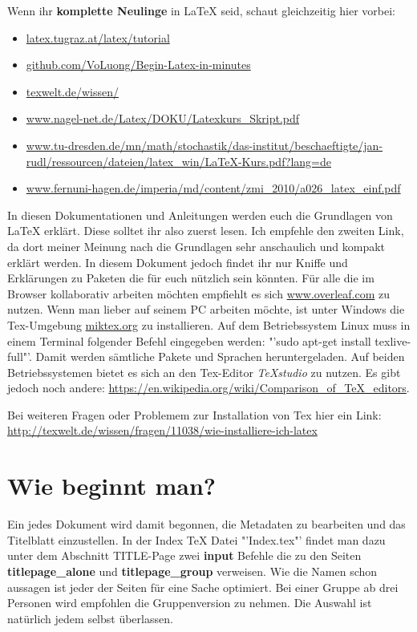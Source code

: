 Wenn ihr \textbf{komplette Neulinge} in LaTeX seid, schaut gleichzeitig hier vorbei:
\begin{itemize}
	\item \url{latex.tugraz.at/latex/tutorial}
	\item \url{github.com/VoLuong/Begin-Latex-in-minutes}
	\item \url{texwelt.de/wissen/}
	\item \url{www.nagel-net.de/Latex/DOKU/Latexkurs_Skript.pdf}
	\item \url{www.tu-dresden.de/mn/math/stochastik/das-institut/beschaeftigte/jan-rudl/ressourcen/dateien/latex_win/LaTeX-Kurs.pdf?lang=de}
	\item \url{www.fernuni-hagen.de/imperia/md/content/zmi_2010/a026_latex_einf.pdf}
\end{itemize} 
In diesen Dokumentationen und Anleitungen werden euch die Grundlagen von \LaTeX{} erklärt. Diese solltet ihr also zuerst lesen. Ich empfehle den zweiten Link, da dort meiner Meinung nach die Grundlagen sehr anschaulich und kompakt erklärt werden. In diesem Dokument jedoch findet ihr nur Kniffe und Erklärungen zu Paketen die für euch nützlich sein könnten.
Für alle die im Browser kollaborativ arbeiten möchten empfiehlt es sich \url{www.overleaf.com} zu nutzen. Wenn man lieber auf seinem PC arbeiten möchte, ist unter Windows die Tex-Umgebung \url{miktex.org} zu installieren. Auf dem Betriebssystem Linux muss in einem Terminal folgender Befehl eingegeben werden: "'sudo apt-get install texlive-full"'. Damit werden sämtliche Pakete und Sprachen heruntergeladen. Auf beiden Betriebssystemen bietet es sich an den Tex-Editor \emph{TeXstudio} zu nutzen. Es gibt jedoch noch andere: \url{https://en.wikipedia.org/wiki/Comparison_of_TeX_editors}.

Bei weiteren Fragen oder Problemem zur Installation von Tex hier ein Link:\\
\url{http://texwelt.de/wissen/fragen/11038/wie-installiere-ich-latex}

\section{Wie beginnt man?}

Ein jedes Dokument wird damit begonnen, die Metadaten zu bearbeiten und das Titelblatt einzustellen. In der Index TeX Datei "'Index.tex"' findet man dazu unter dem Abschnitt TITLE-Page zwei \textbf{input} Befehle die zu den Seiten \textbf{titlepage\_alone} und \textbf{titlepage\_group} verweisen. Wie die Namen schon aussagen ist jeder der Seiten für eine Sache optimiert. Bei einer Gruppe ab drei Personen wird empfohlen die Gruppenversion zu nehmen. Die Auswahl ist natürlich jedem selbst überlassen.\\


